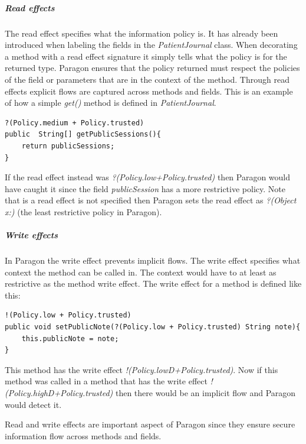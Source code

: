 


\subparagraph{Read effects}
The read effect specifies what the information policy is. It has already been introduced when labeling the fields in the \emph{PatientJournal} class. When decorating a method with a read effect signature it simply tells what the policy is for the returned type. Paragon ensures that the policy returned must respect the policies of the field or parameters that are in the context of the method. Through read effects explicit flows are captured across methods and fields. This is an example of how a simple \emph{get()} method is defined in \emph{PatientJournal}.
\begin{lstlisting}
?(Policy.medium + Policy.trusted)
public  String[] getPublicSessions(){
	return publicSessions;
}
\end{lstlisting}

If the read effect instead was \emph{?(Policy.low+Policy.trusted)} then Paragon would have caught it since the field \emph{publicSession} has a more restrictive policy. Note that is a read effect is not specified then Paragon sets the read effect as \emph{?(Object x:)} (the least restrictive policy in Paragon).

\subparagraph{Write effects}
In Paragon the write effect prevents implicit flows. The write effect specifies what context the method can be called in. The context would have to at least as restrictive as the method write effect. The write effect for a method is defined like this:

\begin{lstlisting}
!(Policy.low + Policy.trusted) 
public void setPublicNote(?(Policy.low + Policy.trusted) String note){
	this.publicNote = note;
}
\end{lstlisting}

This method has the write effect \emph{!(Policy.lowD+Policy.trusted)}. Now if this method was called in a method that has the write effect \emph{!(Policy.highD+Policy.trusted)} then there would be an implicit flow and Paragon would detect it.

Read and write effects are important aspect of Paragon since they ensure secure information flow across methods and fields.

